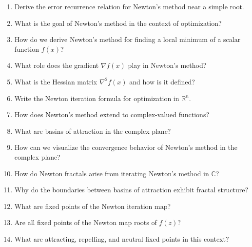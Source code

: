 \begin{enumerate}
  \item Derive the error recurrence relation for Newton's method near a simple root.
  \item What is the goal of Newton's method in the context of optimization?
  \item How do we derive Newton's method for finding a local minimum of a scalar function \(f(x)\)?
  \item What role does the gradient \(\nabla f(x)\) play in Newton's method?
  \item What is the Hessian matrix \(\nabla^{2} f(x)\) and how is it defined?
  \item Write the Newton iteration formula for optimization in \(\mathbb{R}^{n}\).
  \item How does Newton's method extend to complex-valued functions?
  \item What are basins of attraction in the complex plane?
  \item How can we visualize the convergence behavior of Newton's method in the complex plane?
  \item How do Newton fractals arise from iterating Newton's method in \(\mathbb{C}\)?
  \item Why do the boundaries between basins of attraction exhibit fractal structure?
  \item What are fixed points of the Newton iteration map?
  \item Are all fixed points of the Newton map roots of \(f(z)\)?
  \item What are attracting, repelling, and neutral fixed points in this context?
\end{enumerate}
